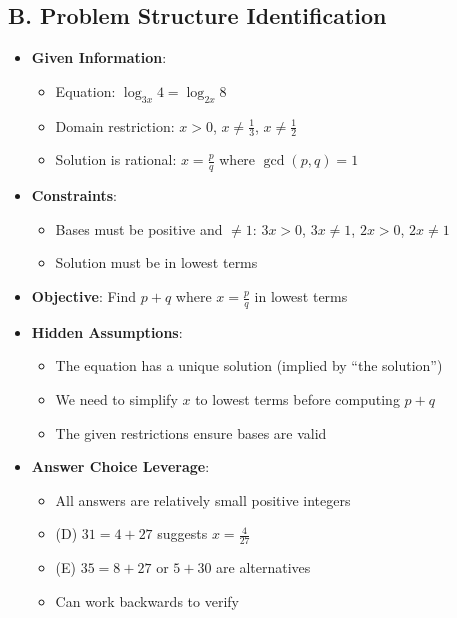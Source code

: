 \documentclass[12pt]{article}
\begin{document}
\begin{problemconfigbox}
\subsection*{B. Problem Structure Identification}
\begin{itemize}[leftmargin=*]
    \item \textbf{Given Information}: 
    \begin{itemize}
        \item Equation: $\log_{3x} 4 = \log_{2x} 8$
        \item Domain restriction: $x > 0$, $x \neq \frac{1}{3}$, $x \neq \frac{1}{2}$
        \item Solution is rational: $x = \frac{p}{q}$ where $\gcd(p,q) = 1$
    \end{itemize}
    \item \textbf{Constraints}: 
    \begin{itemize}
        \item Bases must be positive and $\neq 1$: $3x > 0$, $3x \neq 1$, $2x > 0$, $2x \neq 1$
        \item Solution must be in lowest terms
    \end{itemize}
    \item \textbf{Objective}: Find $p + q$ where $x = \frac{p}{q}$ in lowest terms
    \item \textbf{Hidden Assumptions}: 
    \begin{itemize}
        \item The equation has a unique solution (implied by ``the solution'')
        \item We need to simplify $x$ to lowest terms before computing $p+q$
        \item The given restrictions ensure bases are valid
    \end{itemize}
    \item \textbf{Answer Choice Leverage}: 
    \begin{itemize}
        \item All answers are relatively small positive integers
        \item (D) $31 = 4 + 27$ suggests $x = \frac{4}{27}$
        \item (E) $35 = 8 + 27$ or $5 + 30$ are alternatives
        \item Can work backwards to verify
    \end{itemize}
\end{itemize}


\end{problemconfigbox}
\end{document}
